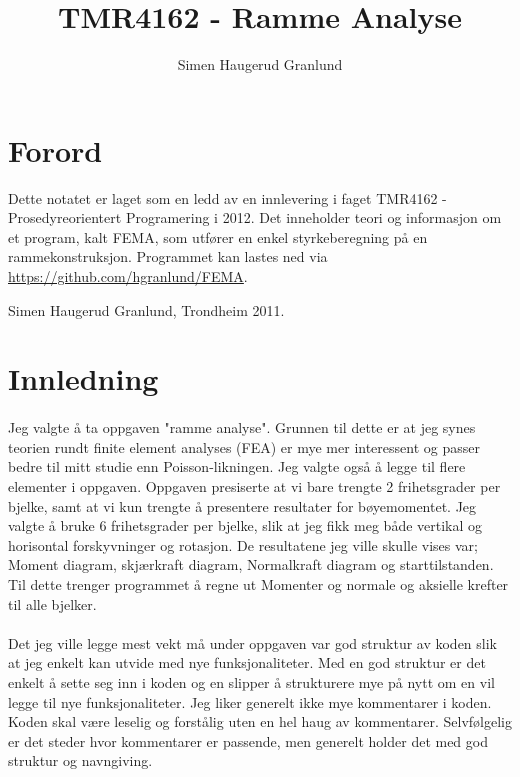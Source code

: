 \documentclass[10pt,a4paper, norsk]{article}
\author{Simen Haugerud Granlund}
\title{TMR4162 - Ramme Analyse}
\begin{document}
\maketitle
\lstset{language=C++,basicstyle=\footnotesize} %
\maketitle
\thispagestyle{empty} 	%
\newpage %

\section*{Forord}
Dette notatet er laget som en ledd av en innlevering i faget TMR4162 - Prosedyreorientert Programering i 2012. Det inneholder teori og informasjon om et program, kalt FEMA, som utfører en enkel styrkeberegning på en rammekonstruksjon. Programmet kan lastes ned via \url{https://github.com/hgranlund/FEMA}.
\begin{flushright}
Simen Haugerud Granlund, Trondheim 2011.
\end{flushright}
\newpage


\tableofcontents
\newpage


\section{Innledning}
\paragraph{}
Jeg valgte å ta oppgaven "ramme analyse". Grunnen til dette er at jeg synes teorien rundt finite element analyses (FEA) er mye mer interessent og passer bedre til mitt studie enn Poisson-likningen. Jeg valgte også å legge til flere elementer i oppgaven. Oppgaven presiserte at vi bare trengte 2 frihetsgrader per bjelke, samt at vi kun trengte å presentere resultater for bøyemomentet. Jeg valgte å bruke 6 frihetsgrader per bjelke, slik at jeg fikk meg både  vertikal og horisontal forskyvninger og rotasjon. De resultatene jeg ville skulle vises var; Moment diagram, skjærkraft diagram, Normalkraft diagram og starttilstanden. Til dette trenger programmet å regne ut Momenter og normale og aksielle krefter til alle bjelker.

\paragraph{}
Det jeg ville legge mest vekt må under oppgaven var god struktur av koden slik at jeg enkelt kan utvide med nye funksjonaliteter. Med en god struktur er det enkelt å sette seg inn i koden og en slipper å strukturere mye på nytt om en vil legge til nye funksjonaliteter. Jeg liker generelt ikke mye kommentarer i koden. Koden skal være leselig og forstålig uten en hel haug av kommentarer. Selvfølgelig er det steder hvor kommentarer er passende, men generelt holder det med god struktur og navngiving.
\end{document}
